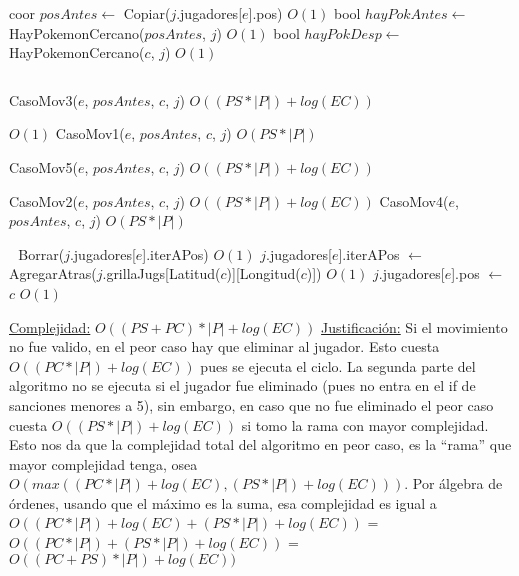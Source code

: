 \begin{Algoritmos}
\begin{algorithmic}[1]
  \State coor $posAntes \gets$ Copiar($j$.jugadores[$e$].pos)  \Comment $O(1)$
  \State bool $hayPokAntes \gets$ HayPokemonCercano($posAntes$, $j$)  \Comment $O(1)$
  \State bool $hayPokDesp \gets$ HayPokemonCercano($c$, $j$)  \Comment $O(1)$ 
  
  \Statex $ $
  
  
      \State CasoMov3($e$, $posAntes$, $c$, $j$)  \Comment $O((PS *|P|) + log(EC))$ 
          
    \Else %
        \Comment $O(1)$
        \State CasoMov1($e$, $posAntes$, $c$, $j$) \Comment $O(PS *|P|)$ 
      \Else

        \State CasoMov5($e$, $posAntes$, $c$, $j$) \Comment  $O((PS *|P|) + log(EC))$ 
      \EndIf    
    \EndIf
  \Else %
      
      \State CasoMov2($e$, $posAntes$, $c$, $j$) \Comment  $O((PS *|P|) + log(EC))$ 
    \Else
      \State CasoMov4($e$, $posAntes$, $c$, $j$) \Comment  $O(PS *|P|)$ 
    \EndIf    
    
  \EndIf
  
  \Statex $ $
  \Statex $ $
  \State Borrar($j$.jugadores[$e$].iterAPos) \Comment $O(1)$
  \State $j$.jugadores[$e$].iterAPos $\gets$ AgregarAtras($j$.grillaJugs[Latitud($c$)][Longitud($c$)]) \Comment $O(1)$
  \State $j$.jugadores[$e$].pos $\gets$ $c$ \Comment $O(1)$ 
  
\EndIf

\medskip
\State \underline{Complejidad:} $O((PS + PC)*|P| + log(EC))$ 
\State \underline{Justificaci\'on:} Si el movimiento no fue valido, en el peor caso hay que eliminar al jugador. Esto cuesta $O((PC *|P|) + log(EC))$ pues se ejecuta el ciclo. La segunda parte del algoritmo no se ejecuta si el jugador fue eliminado (pues no entra en el if de sanciones menores a 5), sin embargo, en caso que no fue eliminado el peor caso cuesta $O((PS *|P|) + log(EC))$ si tomo la rama con mayor complejidad. Esto nos da que la complejidad total del algoritmo en peor caso, es la ``rama'' que mayor complejidad tenga, osea $O(max((PC *|P|) + log(EC), (PS *|P|) + log(EC)))$. Por \'algebra de \'ordenes, usando que el m\'aximo es la suma, esa complejidad es igual a $O((PC *|P|) + log(EC) + (PS *|P|) + log(EC))$ = $O((PC *|P|) + (PS *|P|) + log(EC))$ = $O((PC + PS) *|P|) + log(EC))$


\end{algorithmic}
\end{Algoritmos}
